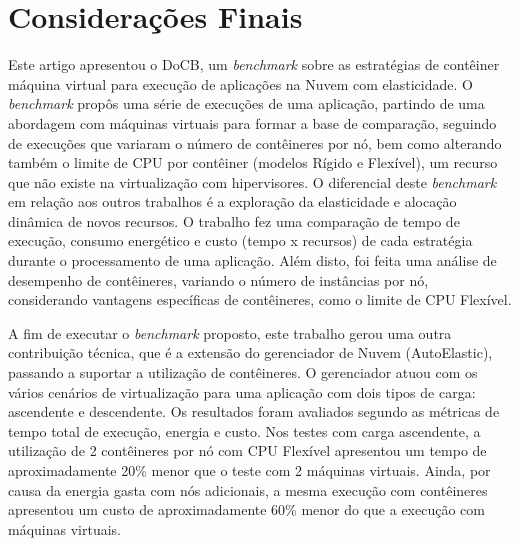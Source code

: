 \documentclass[twoside,english,brazilian]{UNISINOSartigo}
\begin{document}

\section{Considerações Finais}
\label{conclusion}

Este artigo apresentou o DoCB, um \textit{benchmark} sobre as estratégias de contêiner máquina virtual para execução de aplicações na Nuvem com elasticidade. O \textit{benchmark} propôs uma série de execuções de uma aplicação, partindo de uma abordagem com máquinas virtuais para formar a base de comparação, seguindo de execuções que variaram o número de contêineres por nó, bem como alterando também o limite de CPU por contêiner (modelos Rígido e Flexível), um recurso que não existe na virtualização com hipervisores. O diferencial deste \textit{benchmark} em relação aos outros trabalhos é a exploração da elasticidade e alocação dinâmica de novos recursos. O trabalho fez uma comparação de tempo de execução, consumo energético e custo (tempo x recursos) de cada estratégia durante o processamento de uma aplicação. Além disto, foi feita uma análise de desempenho de contêineres, variando o número de instâncias por nó, considerando vantagens específicas de contêineres, como o limite de CPU Flexível. 

A fim de executar o \textit{benchmark} proposto, este trabalho gerou uma outra contribuição técnica, que é a extensão do gerenciador de Nuvem (AutoElastic), passando a suportar a utilização de contêineres. O gerenciador atuou com os vários cenários de virtualização para uma aplicação com dois tipos de carga: ascendente e descendente. Os resultados foram avaliados segundo as métricas de tempo total de execução, energia e custo. Nos testes com carga ascendente, a utilização de 2 contêineres por nó com CPU Flexível apresentou um tempo de aproximadamente 20\% menor que o teste com 2 máquinas virtuais. Ainda, por causa da energia gasta com nós adicionais, a mesma execução com contêineres apresentou um custo de aproximadamente 60\% menor do que a execução com máquinas virtuais. 
\end{document}
